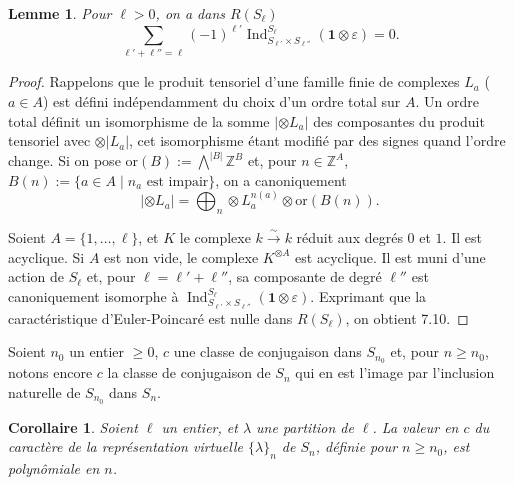 \documentclass[11pt,a4paper]{article}
\theoremstyle{plain}
\newtheorem{lemma}[theorem]{Lemme}
\newtheorem{corollary}[theorem]{Corollaire}
\theoremstyle{definition}
\DeclareMathOperator{\Ind}{Ind}
\newcommand{\Z}{\mathbb{Z}}
\newcommand{\eps}{\varepsilon}
\newcommand{\isom}{\xrightarrow{\sim}}
\begin{document}
\begin{lemma}
Pour $\ell > 0$, on a dans $R(S_\ell)$
\[
\sum_{\ell' + \ell'' = \ell} (-1)^{\ell'} \Ind_{S_{\ell'} \times S_{\ell''}}^{S_\ell}(\mathbf{1} \otimes \eps) = 0.
\]
\end{lemma}

\begin{proof}
Rappelons que le produit tensoriel d'une famille finie de complexes $L_a$ ($a \in A$) est d\'efini ind\'ependamment du choix d'un ordre total sur $A$. Un ordre total d\'efinit un isomorphisme de la somme $|\otimes L_a|$ des composantes du produit tensoriel avec $\otimes |L_a|$, cet isomorphisme \'etant modifi\'e par des signes quand l'ordre change. Si on pose $\text{or}(B) := \bigwedge^{|B|} \Z^B$ et, pour $n \in \Z^A$, $B(n) := \{a \in A \mid n_a \text{ est impair}\}$, on a canoniquement
\[
|\otimes L_a| = \bigoplus_n \otimes L_a^{n(a)} \otimes \text{or}(B(n)).
\]

Soient $A = \{1, \ldots, \ell\}$, et $K$ le complexe $k \isom k$ r\'eduit aux degr\'es $0$ et $1$. Il est acyclique. Si $A$ est non vide, le complexe $K^{\otimes A}$ est acyclique. Il est muni d'une action de $S_\ell$ et, pour $\ell = \ell' + \ell''$, sa composante de degr\'e $\ell''$ est canoniquement isomorphe \`a $\Ind_{S_{\ell'} \times S_{\ell''}}^{S_\ell}(\mathbf{1} \otimes \eps)$. Exprimant que la caract\'eristique d'Euler-Poincar\'e est nulle dans $R(S_\ell)$, on obtient 7.10.
\end{proof}

Soient $n_0$ un entier $\geq 0$, $c$ une classe de conjugaison dans $S_{n_0}$ et, pour $n \geq n_0$, notons encore $c$ la classe de conjugaison de $S_n$ qui en est l'image par l'inclusion naturelle de $S_{n_0}$ dans $S_n$.

\begin{corollary}
Soient $\ell$ un entier, et $\lambda$ une partition de $\ell$. La valeur en $c$ du caract\`ere de la repr\'esentation virtuelle $\{\lambda\}_n$ de $S_n$, d\'efinie pour $n \geq n_0$, est polyn\^omiale en $n$.
\end{corollary}
\end{document}

